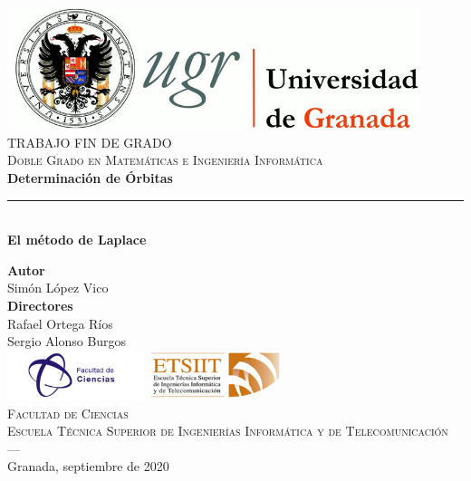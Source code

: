 \begin{titlepage}
 
 
\newlength{\centeroffset}
\setlength{\centeroffset}{-0.5\oddsidemargin}
\addtolength{\centeroffset}{0.5\evensidemargin}
\thispagestyle{empty}

\noindent\hspace*{\centeroffset}

\begin{minipage}{\textwidth}
	\centering
	\includegraphics[width=0.9\textwidth]{images/logo_ugr.jpg}\\[1.2cm]
	
	\textsc{\Large TRABAJO FIN DE GRADO\\[0.2cm]}
	\textsc{Doble Grado en Matemáticas e Ingeniería Informática}\\[0.8cm]
	{\Huge\bfseries Determinación de Órbitas\\
	}
	\noindent\rule[-1ex]{\textwidth}{1pt}\\[2.5ex]
	{\large\bfseries El método de Laplace}
\end{minipage}

\vspace{1cm}

\noindent\hspace*{\centeroffset}

\begin{minipage}{\textwidth}
	\centering
	\textbf{Autor}\\ {Simón López Vico}\\[2.5ex]
	\textbf{Directores}\\ {Rafael Ortega Ríos\\Sergio Alonso Burgos}\\[1.5cm]
	
	\includegraphics[width=0.3\textwidth]{images/logo_ciencias.png}
	\hspace{1.5cm}
	\includegraphics[width=0.3\textwidth]{images/logo_etsiit.png}\\[0.1cm]
	\textsc{Facultad de Ciencias\\Escuela Técnica Superior de Ingenierías Informática y de Telecomunicación}\\
	\textsc{---}\\
	Granada, septiembre de 2020
\end{minipage}
\newpage
\end{titlepage}


